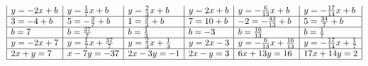 \begin{solution}
$$\begin{array}{|l|l|l|l|l|l|}
y=-2x+b                                                     & y=\frac{1}{7}x+b                                            & y=\frac{2}{3}x+b                                              & y=2x+b                                                          & y=-\frac{6}{13}x+b                                           & y=-\frac{17}{14}x+b                                            \\ \hline
3=-4+b                                                      & 5=-\frac{2}{7}+b                                            & 1=\frac{2}{3}+b                                               & 7=10+b                                                          & -2=-\frac{42}{13}+b                                          & 5=\frac{34}{7}+b                                               \\ \hline
b = 7                                                       & b=\frac{37}{7}                                              & b=\frac{1}{3}                                                 & b=-3                                                            & b=\frac{16}{13}                                              & b=\frac{1}{7}                                                  \\ \hline
y=-2x+7                                                     & y=\frac{1}{7}x+\frac{37}{7}                              & y=\frac{2}{3}x+\frac{1}{3}                                 & y=2x-3                                                          & y=-\frac{6}{13}x+\frac{16}{13}                            & y=-\frac{17}{14}x+\frac{1}{7}                               \\ \hline
2x + y = 7                                                  & x-7y =-37                                                  & 2x-3y =-1                                                    & 2x-y = 3                                                      & 6x + 13y = 16                                                   & 17x + 14y = 2                                                     \\ \hline
\end{array}
$$


\end{solution}

